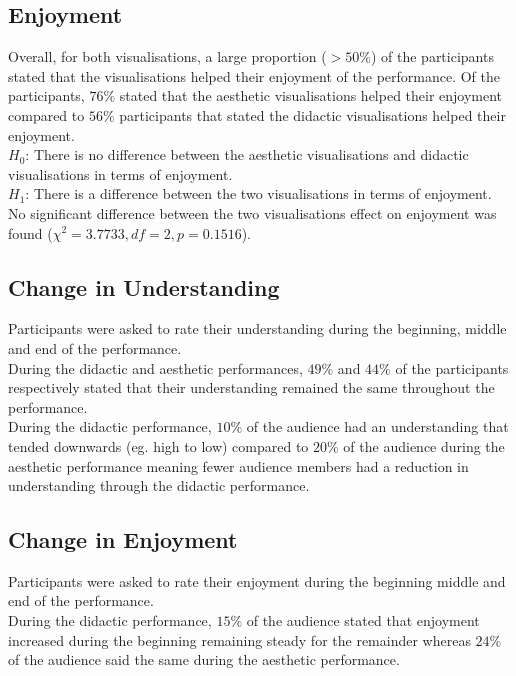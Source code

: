 \subsection{Enjoyment}
Overall, for both visualisations, a large proportion ($> 50\%$) of the participants stated that the visualisations helped their enjoyment of the performance. Of the participants, $76\%$ stated that the aesthetic visualisations helped their enjoyment compared to $56\%$ participants that stated the didactic visualisations helped their enjoyment.\\

$H_0$: There is no difference between the aesthetic visualisations and didactic visualisations in terms of enjoyment.\\
$H_1$: There is a difference between the two visualisations in terms of enjoyment.\\

No significant difference between the two visualisations effect on enjoyment was found ($\chi^2=3.7733,df=2,p=0.1516$).

\subsection{Change in Understanding}

Participants were asked to rate their understanding during the beginning, middle and end of the performance.\\

During the didactic and aesthetic performances, $49\%$ and $44\%$ of the participants respectively stated that their understanding remained the same throughout the performance.\\

During the didactic performance, $10\%$ of the audience had an understanding that tended downwards (eg. high to low) compared to $20\%$ of the audience during the aesthetic performance meaning fewer audience members had a reduction in understanding through the didactic performance.\\

\subsection{Change in Enjoyment}

Participants were asked to rate their enjoyment during the beginning middle and end of the performance.\\

During the didactic performance, $15\%$ of the audience stated that enjoyment increased during the beginning remaining steady for the remainder whereas $24\%$ of the audience said the same during the aesthetic performance.\\

